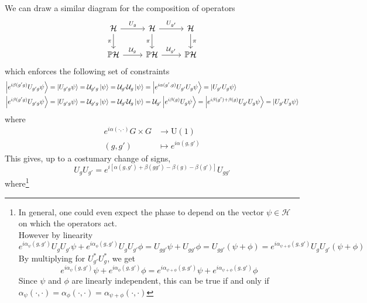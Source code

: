 \documentclass[11pt]{article}
\theoremstyle{definition}
\numberwithin{equation}{section}
\newcommand*\cH{\mathcal{H}}
\newcommand*\cU{\mathcal{U}}
\newcommand*\bbP{\mathbb{P}}
\newcommand*\U{\mathrm{U}}
\begin{document}
We can draw a similar diagram for the composition of operators
\[
\begin{tikzcd}
\cH \arrow{r}{U_g} \arrow[swap]{d}{\pi} & \cH \arrow{r}{U_{g'}} \arrow[swap]{d}{\pi} &\cH \arrow{d}{\pi}  \\
\bbP \cH \arrow{r}{\cU_g} & \bbP \cH \arrow{r}{\cU_{g'}} &\bbP\cH
\end{tikzcd}\]
which enforces the following set of constraints
\begin{equation}
\begin{aligned}
 	\ket{e^{i \beta(g' g) }  U_{g'g}\psi}&=  \ket{ U_{g'g} \psi} =  \cU_{g' g}  \ket{\psi} = 	\cU_{g'} \cU_g  \ket{\psi} =  \ket{ e^{i \alpha(g',g)}U_{g'} U_g \psi }  =  \ket{  U_{g'} U_g \psi }   \\
 	\ket{e^{i \beta(g' g) }  U_{g'g}\psi}&=  \ket{ U_{g'g} \psi}=    \cU_{g' g}  \ket{\psi} = 	\cU_{g'} \cU_g  \ket{\psi}  =  \cU_{g'} \ket{e^{i \beta(g)} U_g \psi} = \ket{e^{i 	\beta(g') + \beta(g)}U_{g'} U_{g} \psi} = \ket{  U_{g'} U_g \psi }  \\ 
\end{aligned}
\end{equation}
where
\begin{equation}
    \begin{aligned}
        e^{i \alpha(\cdot, \cdot )}  G \times G &\to \U(1)\\
        (g,g') &\mapsto e^{i \alpha(g,g')}
    \end{aligned}
\end{equation}
This gives, up to a costumary change of signs,
\begin{equation}\label{proj}
    U_g U_{g'} = e^{ i [\alpha(g,g') +  \beta(g g') - \beta(g) - \beta(g')]}U_{gg'}
\end{equation}
where\footnote{In general, one could even expect the phase to depend on the vector $\psi \in \cH$ on which the operators act.\\
However by linearity
\begin{equation}
 	e^{i \alpha_{\psi}(g,g')} U_{g} U_{g'} \psi + e^{i \alpha_{\phi}(g,g')} U_{g} U_{g'} \phi   = U_{gg'} \psi + U_{gg'} \phi= U_{gg'}(\psi + \phi) =  e^{i \alpha_{\psi + \phi}(g,g')} U_g U_{g'} (\psi + \phi)  
\end{equation}
By multiplying for $U_{g'}^* U_g^*$, we get
\begin{equation}
    e^{i \alpha_{\psi}(g,g')} \psi + e^{i \alpha_{\phi}(g,g')} \phi =   e^{i \alpha_{\psi + \phi}(g,g')} \psi + e^{i \alpha_{\psi + \phi}(g,g')}  \phi
\end{equation}
Since $\psi$ and $\phi$ are linearly independent, this can be true if and only if $\alpha_{\psi}(\cdot, \cdot) = \alpha_{\phi}(\cdot, \cdot) = \alpha_{\psi + \phi}(\cdot, \cdot)$
}
\end{document}
